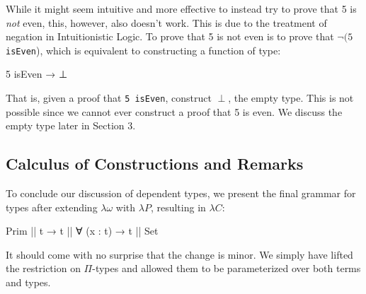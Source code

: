 \documentclass[12pt]{article}
\begin{document}
While it might seem intuitive and more effective to instead try to prove that 5
is {\em not} even, this, however, also doesn't work. This is due to the
treatment of negation in Intuitionistic Logic. To prove that 5 is not even is
to prove that \(\neg (5\) {\tt isEven}), which is equivalent to constructing a
function of type:
\begin{center}
\begin{minipage}{0.3\textwidth}
\begin{code}
5 isEven → ⊥
\end{code}
\end{minipage}
\end{center}
That is, given a proof that {\tt 5 isEven}, construct \(\perp\), the empty type.
This is not possible since we cannot ever construct a proof that 5 is even. We
discuss the empty type later in Section 3.

\subsection*{Calculus of Constructions and Remarks}
To conclude our discussion of dependent types, we present the final grammar for
types after extending \(\lambda\omega\) with \(\lambda P\), resulting in
\(\lambda C\):
\begin{center}
\begin{minipage}{0.6\textwidth}
\begin{code}
Prim || t → t || ∀ (x : t) → t || Set
\end{code}
\end{minipage}
\end{center}
It should come with no surprise that the change is minor. We simply have lifted
the restriction on \(\Pi\)-types and allowed them to be parameterized over both
terms and types.
\end{document}
